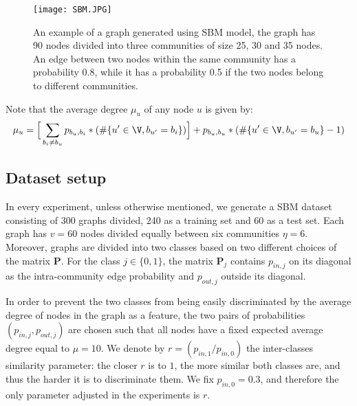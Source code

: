 \begin{figure}[H]
\centering
\texttt{[image: SBM.JPG]}
\caption[Visualization of an SBM-based graph example]{An example of a graph generated using SBM model, the graph has 90 nodes divided into three communities of size 25, 30 and 35 nodes. An edge between two nodes within the same community has a probability 0.8, while it has a probability 0.5 if the two nodes belong to different communities.}
\label{fig:SBM_example}
\end{figure}

Note that the average degree $\mu_u$ of any node $u$ is given by:
\begin{equation}
    \mu_u=\Big[\sum_{b_i\neq b_u} p_{b_u,b_i}*(\#\{ u'\in \V, b_{u'}=b_i \} )\Big]+p_{b_u,b_u}*(\#\{u'\in \V, b_{u'}=b_u \}-1 )
\end{equation}

\subsection{Dataset setup}

In every experiment, unless otherwise mentioned, we generate a SBM dataset consisting of 300 graphs divided, 240 as a training set and 60 as a test set. Each graph has $v=60$ nodes divided equally between six communities $\eta=6$. Moreover, graphs are divided into two classes based on two different choices of the matrix $\mathbf{P}$. For the class $j\in\{0,1\}$, the matrix $\mathbf{P}_j$ contains $p_{in,j}$ on its diagonal as the intra-community edge probability and $p_{out,j}$ outside its diagonal.

In order to prevent the two classes from being easily discriminated by the average degree of nodes in the graph as a feature, the two pairs of probabilities $(p_{in,j}, p_{out,j})$ are chosen such that all nodes have a fixed expected average degree equal to $\mu=10$. We denote by $r=(p_{in,1}/p_{in,0})$ the inter-classes similarity parameter: the closer $r$ is to $1$, the more similar both classes are, and thus the harder it is to discriminate them. We fix $p_{in,0} = 0.3$, and therefore the only parameter adjusted in the experiments is $r$. 

